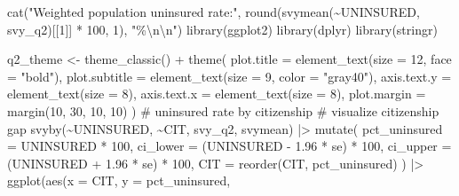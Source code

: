 \documentclass[
  letterpaper,
  DIV=11,
  numbers=noendperiod]{scrartcl}
\newenvironment{Shaded}{\begin{snugshade}}{\end{snugshade}}
\newcommand{\AttributeTok}[1]{\textcolor[rgb]{0.40,0.45,0.13}{#1}}
\newcommand{\CommentTok}[1]{\textcolor[rgb]{0.37,0.37,0.37}{#1}}
\newcommand{\DecValTok}[1]{\textcolor[rgb]{0.68,0.00,0.00}{#1}}
\newcommand{\FloatTok}[1]{\textcolor[rgb]{0.68,0.00,0.00}{#1}}
\newcommand{\FunctionTok}[1]{\textcolor[rgb]{0.28,0.35,0.67}{#1}}
\newcommand{\NormalTok}[1]{\textcolor[rgb]{0.00,0.23,0.31}{#1}}
\newcommand{\OtherTok}[1]{\textcolor[rgb]{0.00,0.23,0.31}{#1}}
\newcommand{\SpecialCharTok}[1]{\textcolor[rgb]{0.37,0.37,0.37}{#1}}
\newcommand{\StringTok}[1]{\textcolor[rgb]{0.13,0.47,0.30}{#1}}
\begin{document}
\begin{Shaded}
\begin{Highlighting}[]
\FunctionTok{cat}\NormalTok{(}\StringTok{"Weighted population uninsured rate:"}\NormalTok{,}
    \FunctionTok{round}\NormalTok{(}\FunctionTok{svymean}\NormalTok{(}\SpecialCharTok{\textasciitilde{}}\NormalTok{UNINSURED, svy\_q2)[[}\DecValTok{1}\NormalTok{]] }\SpecialCharTok{*} \DecValTok{100}\NormalTok{, }\DecValTok{1}\NormalTok{), }\StringTok{"\%}\SpecialCharTok{\textbackslash{}n\textbackslash{}n}\StringTok{"}\NormalTok{)}
\FunctionTok{library}\NormalTok{(ggplot2)}
\FunctionTok{library}\NormalTok{(dplyr)}
\FunctionTok{library}\NormalTok{(stringr)}

\NormalTok{q2\_theme }\OtherTok{\textless{}{-}} \FunctionTok{theme\_classic}\NormalTok{() }\SpecialCharTok{+}
  \FunctionTok{theme}\NormalTok{(}
    \AttributeTok{plot.title    =} \FunctionTok{element\_text}\NormalTok{(}\AttributeTok{size =} \DecValTok{12}\NormalTok{, }\AttributeTok{face =} \StringTok{"bold"}\NormalTok{),}
    \AttributeTok{plot.subtitle =} \FunctionTok{element\_text}\NormalTok{(}\AttributeTok{size =} \DecValTok{9}\NormalTok{, }\AttributeTok{color =} \StringTok{"gray40"}\NormalTok{),}
    \AttributeTok{axis.text.y   =} \FunctionTok{element\_text}\NormalTok{(}\AttributeTok{size =} \DecValTok{8}\NormalTok{),}
    \AttributeTok{axis.text.x   =} \FunctionTok{element\_text}\NormalTok{(}\AttributeTok{size =} \DecValTok{8}\NormalTok{),}
    \AttributeTok{plot.margin   =} \FunctionTok{margin}\NormalTok{(}\DecValTok{10}\NormalTok{, }\DecValTok{30}\NormalTok{, }\DecValTok{10}\NormalTok{, }\DecValTok{10}\NormalTok{)}
\NormalTok{  )}
\CommentTok{\# uninsured rate by citizenship}
\CommentTok{\# visualize citizenship gap}
\FunctionTok{svyby}\NormalTok{(}\SpecialCharTok{\textasciitilde{}}\NormalTok{UNINSURED, }\SpecialCharTok{\textasciitilde{}}\NormalTok{CIT, svy\_q2, svymean) }\SpecialCharTok{|\textgreater{}}
  \FunctionTok{mutate}\NormalTok{(}
    \AttributeTok{pct\_uninsured =}\NormalTok{ UNINSURED }\SpecialCharTok{*} \DecValTok{100}\NormalTok{,}
    \AttributeTok{ci\_lower      =}\NormalTok{ (UNINSURED }\SpecialCharTok{{-}} \FloatTok{1.96} \SpecialCharTok{*}\NormalTok{ se) }\SpecialCharTok{*} \DecValTok{100}\NormalTok{,}
    \AttributeTok{ci\_upper      =}\NormalTok{ (UNINSURED }\SpecialCharTok{+} \FloatTok{1.96} \SpecialCharTok{*}\NormalTok{ se) }\SpecialCharTok{*} \DecValTok{100}\NormalTok{,}
    \AttributeTok{CIT           =} \FunctionTok{reorder}\NormalTok{(CIT, pct\_uninsured)}
\NormalTok{  ) }\SpecialCharTok{|\textgreater{}}
  \FunctionTok{ggplot}\NormalTok{(}\FunctionTok{aes}\NormalTok{(}\AttributeTok{x =}\NormalTok{ CIT, }\AttributeTok{y =}\NormalTok{ pct\_uninsured,}

\end{Highlighting}
\end{Shaded}
\end{document}
